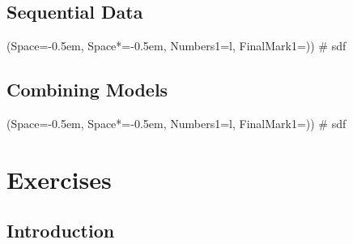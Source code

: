 \documentclass[12pt, a4paper]{article}
\newcommand{\listSpace}{-0.5em}%
\begin{document}
\subsection{Sequential Data}
\begin{easylist}[itemize]
	\ListProperties(Space=\listSpace, Space*=\listSpace, Numbers1=l, FinalMark1={)})
	# sdf
\end{easylist}

\subsection{Combining Models}
\begin{easylist}[itemize]
	\ListProperties(Space=\listSpace, Space*=\listSpace, Numbers1=l, FinalMark1={)})
	# sdf
\end{easylist}

















\clearpage
\section{Exercises}

\subsection{Introduction}
\end{document}
